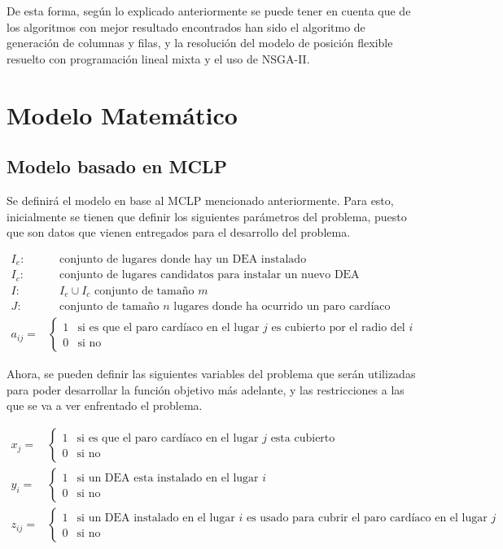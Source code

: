 \documentclass[letter, 10pt]{article}
\begin{document}
De esta forma, seg\'un lo explicado anteriormente se puede tener en cuenta que de los algoritmos con mejor resultado encontrados han sido el algoritmo de generaci\'on de columnas y filas, y la resoluci\'on del modelo de posici\'on flexible resuelto con programaci\'on lineal mixta y el uso de NSGA-II.

\section{Modelo Matem\'atico}
\subsection{Modelo basado en MCLP}
Se definir\'a el modelo en base al MCLP mencionado anteriormente. Para esto, inicialmente se tienen que definir los siguientes par\'ametros del problema, puesto que son datos que vienen entregados para el desarrollo del problema.

\begin{align*}
    I_{e}: & \quad \text{conjunto de lugares donde hay un DEA instalado}\\
    I_{c}: & \quad \text{conjunto de lugares candidatos para instalar un nuevo DEA}\\
    I: & \quad I_{e} \cup I_{c} \text{ conjunto de tama\~no $m$}\\
    J: & \quad \text{conjunto de tama\~no $n$ lugares donde ha ocurrido un paro card\'iaco}\\
    a_{ij} = & \begin{cases}
    1 & \text{si es que el paro card\'iaco en el lugar $j$ es cubierto por el radio del $i$}\\
    0 & \text{si no}
    \end{cases}
\end{align*}

Ahora, se pueden definir las siguientes variables del problema que ser\'an utilizadas para poder desarrollar la funci\'on objetivo m\'as adelante, y las restricciones a las que se va a ver enfrentado el problema.

\begin{align*}
    x_{j} = & \begin{cases}
    1 & \text{si es que el paro card\'iaco en el lugar $j$ esta cubierto}\\
    0 & \text{si no}
    \end{cases}\\
    y_{i} = & \begin{cases}
    1 & \text{si un DEA esta instalado en el lugar $i$}\\
    0 & \text{si no}
    \end{cases}\\
    z_{ij} = & \begin{cases}
    1 & \text{si un DEA instalado en el lugar $i$ es usado para cubrir el paro card\'iaco en el lugar $j$}\\
    0 & \text{si no}
    \end{cases}\\
\end{align*}
\end{document}

